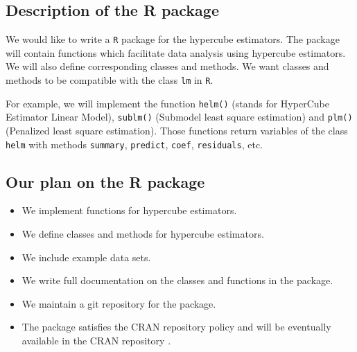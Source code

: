 \documentclass[draft]{article}
\begin{document}
\subsection{Description of the R package}

We would like to write a {\tt R} package\cite{leisch2008creating} for the hypercube estimators. The package will contain functions which facilitate data analysis using hypercube estimators. We will also define corresponding classes and methods. We want classes and methods to be compatible with the class {\tt lm} in {\tt R}.

For example, we will implement the function \texttt{helm()} (stands for HyperCube Estimator Linear Model), \texttt{sublm()} (Submodel least square estimation) and \texttt{plm()} (Penalized least square estimation). Those functions return variables of the class {\tt helm} with methods {\tt summary}, {\tt predict}, {\tt coef}, {\tt residuals}, etc.

\subsection{Our plan on the R package}

\begin{itemize}

	\item We implement functions for hypercube estimators.

	\item We define classes and methods for hypercube estimators.

	\item We include example data sets.

	\item We write full documentation on the classes and functions in the package.

	\item We maintain a git repository for the package.

	\item The package satisfies the CRAN repository policy and will be eventually available in the CRAN repository .

\end{itemize}
\end{document}
